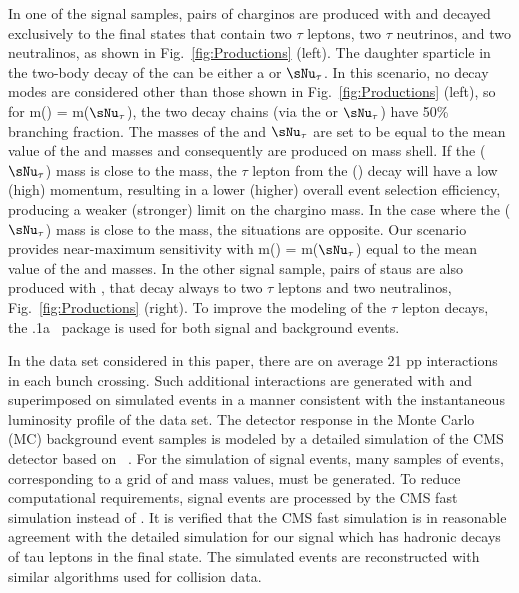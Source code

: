 In one of the signal samples, pairs of charginos are produced with  and decayed exclusively to the final states that contain 
two $\tau$ leptons, two $\tau$ neutrinos, and two neutralinos, as shown in Fig.~\ref{fig:Productions} (left). 
The daughter sparticle in the two-body decay of the \chione can be either a \sTau or $\sNu_{\tau}$. 
In this scenario, no decay modes are considered other than those shown in Fig.~\ref{fig:Productions} (left), so for m(\sTau) = m($\sNu_{\tau}$), the two decay chains 
(via the \sTau or $\sNu_{\tau}$) have 50\% branching fraction.
The masses of the \sTau and $\sNu_{\tau}$ are set to be equal to the mean value of the \chione and \PSGczDo masses and consequently are produced on mass shell.
If the \sTau ($\sNu_{\tau}$) mass is close to the \PSGczDo mass, the $\tau$ lepton from the \sTau (\chione) decay will 
have a low (high) momentum, resulting in a lower (higher) overall event selection efficiency, 
producing a weaker (stronger) limit on the chargino mass.
In the case where the \sTau ($\sNu_{\tau}$) mass is close to the \chione mass, the situations are opposite.
Our scenario provides near-maximum sensitivity with m(\sTau) = m($\sNu_{\tau}$) equal to the mean value of the \chione and \PSGczDo masses. 
In the other signal sample, pairs of staus are also produced with , 
that decay always to two $\tau$ leptons and two neutralinos, Fig.~\ref{fig:Productions} (right). 
To improve the modeling of the $\tau$ lepton decays, the .1a~\cite{Davidson:2010rw} package is used for both signal and background events. 

In the data set considered in this paper,
there are on average 21 pp interactions in each bunch crossing.
Such additional interactions are generated with \PYTHIA and superimposed on simulated events in a manner consistent with 
the instantaneous luminosity profile of the data set.
The detector response in the  Monte Carlo (MC) background event samples is modeled by a
detailed simulation
of the CMS detector based on {\GEANTfour}~\cite{Agostinelli:2002hh}.  
For the simulation of signal events, many samples of events, corresponding to a grid of \chione and \PSGczDo mass values, must be generated. 
To reduce  computational requirements, signal events are processed by the CMS fast simulation \cite{Abdullin:2011zz} instead of {\GEANTfour}. 
It is verified that the CMS fast simulation is in reasonable agreement with the detailed simulation for our signal which has hadronic decays of 
tau leptons in the final state.
The simulated events are reconstructed with similar algorithms used for collision data.

